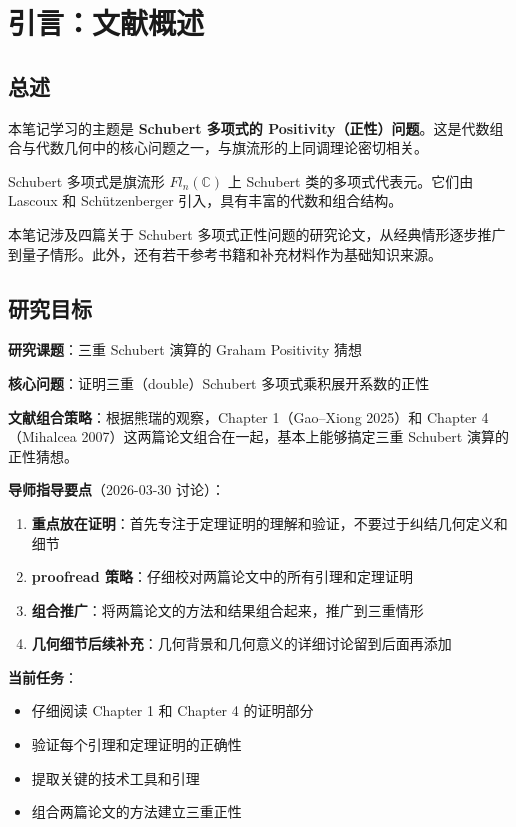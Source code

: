 
\chapter*{引言：文献概述}
\label{chap:Intro}

\section{总述}

本笔记学习的主题是 \textbf{Schubert 多项式的 Positivity（正性）问题}。这是代数组合与代数几何中的核心问题之一，与旗流形的上同调理论密切相关。

Schubert 多项式是旗流形 $Fl_n(\mathbb{C})$ 上 Schubert 类的多项式代表元。它们由 Lascoux 和 Schützenberger 引入，具有丰富的代数和组合结构。

本笔记涉及四篇关于 Schubert 多项式正性问题的研究论文，从经典情形逐步推广到量子情形。此外，还有若干参考书籍和补充材料作为基础知识来源。

\section{研究目标}
\label{sec:ResearchGoal}

\textbf{研究课题}：三重 Schubert 演算的 Graham Positivity 猜想

\textbf{核心问题}：证明三重（double）Schubert 多项式乘积展开系数的正性

\textbf{文献组合策略}：根据熊瑞的观察，Chapter 1（Gao--Xiong \cite{GX2025} 2025）和 Chapter 4（Mihalcea 2007）这两篇论文组合在一起，基本上能够搞定三重 Schubert 演算的正性猜想。

\textbf{导师指导要点}（2026-03-30 讨论）：

\begin{enumerate}
\item \textbf{重点放在证明}：首先专注于定理证明的理解和验证，不要过于纠结几何定义和细节
\item \textbf{proofread 策略}：仔细校对两篇论文中的所有引理和定理证明
\item \textbf{组合推广}：将两篇论文的方法和结果组合起来，推广到三重情形
\item \textbf{几何细节后续补充}：几何背景和几何意义的详细讨论留到后面再添加
\end{enumerate}

\textbf{当前任务}：
\begin{itemize}
\item 仔细阅读 Chapter 1 和 Chapter 4 的证明部分
\item 验证每个引理和定理证明的正确性
\item 提取关键的技术工具和引理
\item 组合两篇论文的方法建立三重正性
\end{itemize}


